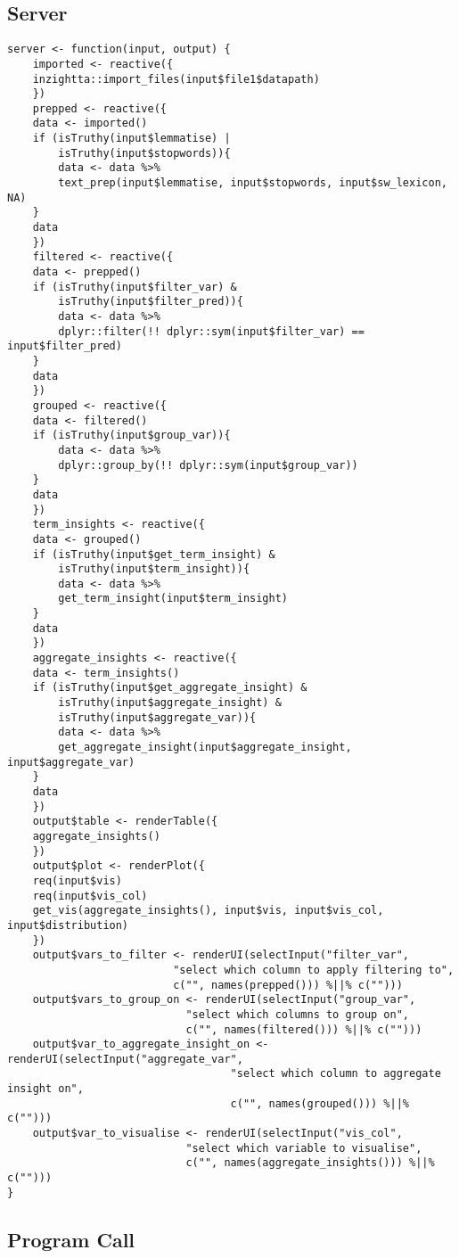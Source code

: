 \documentclass[a4paper, 11pt]{article}
\begin{document}
\subsection{Server}
\label{sec:org99c1786}
\begin{verbatim}
server <- function(input, output) {
    imported <- reactive({
	inzightta::import_files(input$file1$datapath)
    })
    prepped <- reactive({
	data <- imported()
	if (isTruthy(input$lemmatise) |
	    isTruthy(input$stopwords)){
	    data <- data %>%
		text_prep(input$lemmatise, input$stopwords, input$sw_lexicon, NA)
	}
	data
    })
    filtered <- reactive({
	data <- prepped()
	if (isTruthy(input$filter_var) &
	    isTruthy(input$filter_pred)){
	    data <- data %>%
		dplyr::filter(!! dplyr::sym(input$filter_var) == input$filter_pred)
	}
	data
    })
    grouped <- reactive({
	data <- filtered()
	if (isTruthy(input$group_var)){
	    data <- data %>%
		dplyr::group_by(!! dplyr::sym(input$group_var))
	}
	data
    })
    term_insights <- reactive({
	data <- grouped()
	if (isTruthy(input$get_term_insight) &
	    isTruthy(input$term_insight)){
	    data <- data %>%
		get_term_insight(input$term_insight)
	}
	data
    })
    aggregate_insights <- reactive({
	data <- term_insights()
	if (isTruthy(input$get_aggregate_insight) &
	    isTruthy(input$aggregate_insight) &
	    isTruthy(input$aggregate_var)){
	    data <- data %>%
		get_aggregate_insight(input$aggregate_insight, input$aggregate_var)
	}
	data
    })
    output$table <- renderTable({
	aggregate_insights()
    })
    output$plot <- renderPlot({
	req(input$vis)
	req(input$vis_col)  
	get_vis(aggregate_insights(), input$vis, input$vis_col, input$distribution)
    })
    output$vars_to_filter <- renderUI(selectInput("filter_var",
						  "select which column to apply filtering to",
						  c("", names(prepped())) %||% c("")))
    output$vars_to_group_on <- renderUI(selectInput("group_var",
						    "select which columns to group on",
						    c("", names(filtered())) %||% c("")))
    output$var_to_aggregate_insight_on <- renderUI(selectInput("aggregate_var",
							       "select which column to aggregate insight on",
							       c("", names(grouped())) %||% c("")))
    output$var_to_visualise <- renderUI(selectInput("vis_col",
						    "select which variable to visualise",
						    c("", names(aggregate_insights())) %||% c("")))
}
\end{verbatim}

\subsection{Program Call}
\label{sec:orgea9aa89}
\end{document}

